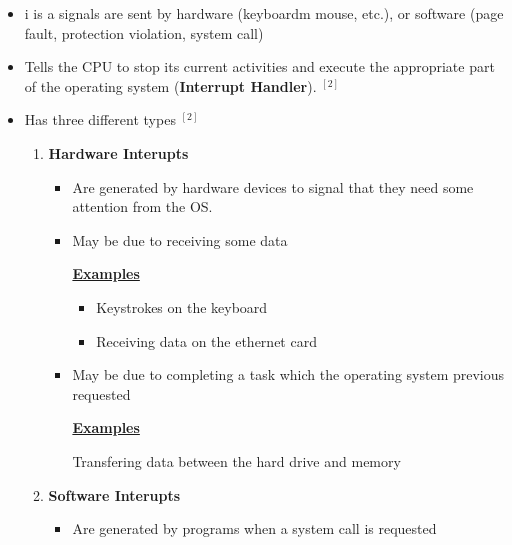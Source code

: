\documentclass[12pt]{article}
\begin{document}
\begin{itemize}
    \item i is a signals are sent by hardware (keyboardm mouse, etc.), or software (page fault, protection violation, system call)
    \item Tells the CPU to stop its current activities and execute the appropriate part of the operating system (\textbf{Interrupt Handler}). $^{[2]}$
    \item Has three different types $^{[2]}$

    \begin{enumerate}[1)]
        \item \textbf{Hardware Interupts}

        \begin{itemize}
            \item Are generated by hardware devices to signal that they need some attention from the OS.
            \item May be due to receiving some data

            \bigskip

            \underline{\textbf{Examples}}

            \bigskip

            \begin{itemize}
                \item Keystrokes on the keyboard
                \item Receiving data on the ethernet card
            \end{itemize}

            \bigskip

            \item May be due to completing a task which the operating system previous requested

            \bigskip

            \underline{\textbf{Examples}}

            \bigskip

            Transfering data between the hard drive and memory
        \end{itemize}

        \bigskip

        \item \textbf{Software Interupts}

        \bigskip

        \begin{itemize}
            \item Are generated by programs when a system call is requested
        \end{itemize}


\end{enumerate}
\end{itemize}
\end{document}
